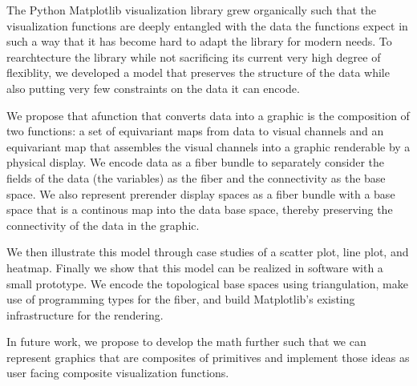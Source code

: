 The Python Matplotlib visualization library grew organically such that the visualization functions are deeply entangled with the data the functions expect in such a way that it has become hard to adapt the library for modern needs. To rearchtecture the library while not sacrificing its current very high degree of flexiblity, we developed a model that preserves the structure of the data while also putting very few constraints on the data it can encode. 

We propose that afunction that converts data into a graphic is the composition of two functions: a set of equivariant maps from data to visual channels and an equivariant map that assembles the visual channels into a graphic renderable by a physical display. We encode data as a fiber bundle to separately consider the fields of the data (the variables) as the fiber and the connectivity as the base space. We also represent prerender display spaces as a fiber bundle with a base space that is a continous map into the data base space, thereby preserving the connectivity of the data in the graphic. 

We then illustrate this model through case studies of a scatter plot, line plot, and heatmap. Finally we show that this model can be realized in software with a small prototype. We encode the topological base spaces using triangulation, make use of programming types for the fiber, and build Matplotlib's existing infrastructure for the rendering.  

In future work, we propose to develop the math further such that we can represent graphics that are composites of primitives and implement those ideas as user facing composite visualization functions. 
